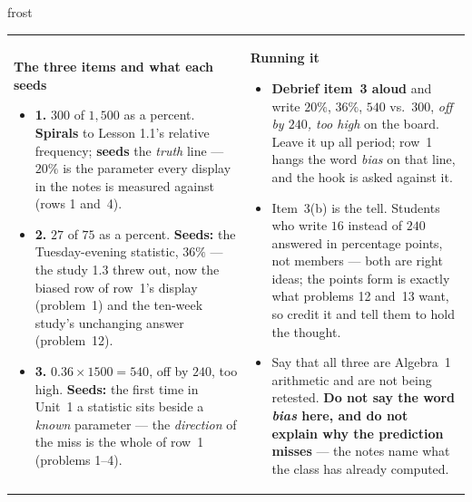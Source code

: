 \documentclass[10pt]{article}
\begin{document}
\begin{fixedskillbox}{frost}
\begin{tabularx}{\linewidth}{@{}X X@{}}
\begin{minipage}[t]{\linewidth}\vspace{0pt}
    \textbf{The three items and what each seeds}
    \begin{itemize}[leftmargin=1.1em, itemsep=1pt, topsep=2pt]
      \item \textbf{1.} $300$ of $1{,}500$ as a percent. \textbf{Spirals} to Lesson 1.1's
            relative frequency; \textbf{seeds} the \emph{truth} line --- $20\%$ is the
            parameter every display in the notes is measured against (rows 1 and~4).
      \item \textbf{2.} $27$ of $75$ as a percent. \textbf{Seeds:} the Tuesday-evening
            statistic, $36\%$ --- the study 1.3 threw out, now the biased row of row~1's
            display (problem~1) and the ten-week study's unchanging answer (problem~12).
      \item \textbf{3.} $0.36 \times 1500 = 540$, off by $240$, too high. \textbf{Seeds:} the
            first time in Unit~1 a statistic sits beside a \emph{known} parameter --- the
            \emph{direction} of the miss is the whole of row~1 (problems 1--4).
    \end{itemize}
\end{minipage}
&
\begin{minipage}[t]{\linewidth}\vspace{0pt}
    \textbf{Running it}
    \begin{itemize}[leftmargin=1.1em, itemsep=1pt, topsep=2pt]
      \item \textbf{Debrief item~3 aloud} and write $20\%$, $36\%$, $540$ vs.\ $300$, \emph{off
            by $240$, too high} on the board. Leave it up all period; row~1 hangs the word
            \emph{bias} on that line, and the hook is asked against it.
      \item Item~3(b) is the tell. Students who write $16$ instead of $240$ answered in
            percentage points, not members --- both are right ideas; the points form is exactly
            what problems 12 and~13 want, so credit it and tell them to hold the thought.
      \item Say that all three are Algebra~1 arithmetic and are not being retested. \textbf{Do
            not say the word \emph{bias} here, and do not explain why the prediction misses}
            --- the notes name what the class has already computed.
    \end{itemize}
\end{minipage}
\end{tabularx}
\end{fixedskillbox}
\end{document}
